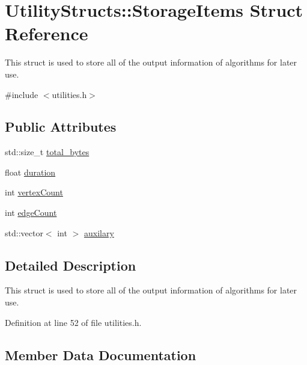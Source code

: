 \hypertarget{struct_utility_structs_1_1_storage_items}{}\section{Utility\+Structs\+:\+:Storage\+Items Struct Reference}
\label{struct_utility_structs_1_1_storage_items}


This struct is used to store all of the output information of algorithms for later use.  




{\ttfamily \#include $<$utilities.\+h$>$}

\subsection*{Public Attributes}
\begin{DoxyCompactItemize}
\item 
std\+::size\+\_\+t \hyperlink{struct_utility_structs_1_1_storage_items_a39cf482db54d8e6ac473b438444c8a1e}{total\+\_\+bytes}
\item 
float \hyperlink{struct_utility_structs_1_1_storage_items_a65e7df5611a4e144cc27576bd3041f6c}{duration}
\item 
int \hyperlink{struct_utility_structs_1_1_storage_items_af72522be713f23fcfe3ac66780183fda}{vertex\+Count}
\item 
int \hyperlink{struct_utility_structs_1_1_storage_items_afafcba9bb103108e2c1e1d9254fb75c5}{edge\+Count}
\item 
std\+::vector$<$ int $>$ \hyperlink{struct_utility_structs_1_1_storage_items_afb9d346eaacb1c5e7f60f559c45910f2}{auxilary}
\end{DoxyCompactItemize}


\subsection{Detailed Description}
This struct is used to store all of the output information of algorithms for later use. 

Definition at line 52 of file utilities.\+h.



\subsection{Member Data Documentation}
\mbox{\label{struct_utility_structs_1_1_storage_items_afb9d346eaacb1c5e7f60f559c45910f2}} 
